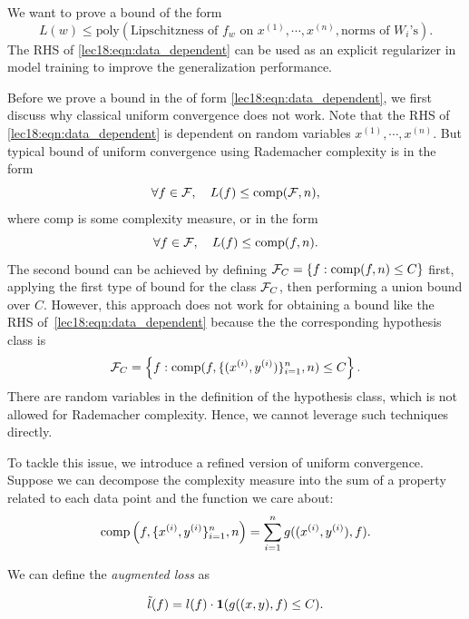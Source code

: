 We want to prove a bound of the form
\begin{equation}\label{lec18:eqn:data_dependent}
L(w)\leq \text{poly}(\text{Lipschitzness of $f_w$ on $x^{(1)}, \cdots, x^{(n)}$}, \text{norms of $W_i$'s}).
\end{equation}
The RHS of \eqref{lec18:eqn:data_dependent} can be used as an explicit regularizer in model training to improve the generalization performance. 

Before we prove a bound in the of form \eqref{lec18:eqn:data_dependent}, we first discuss why classical uniform convergence does not work. Note that the RHS of \eqref{lec18:eqn:data_dependent} is dependent on random variables $x^{(1)}, \cdots, x^{(n)}$. But typical bound of uniform convergence using Rademacher complexity is in the form
\begin{equation}
\forall f \in \mathcal F,\quad L(f) \leq \text{comp}(\mathcal F, n),
\end{equation}
where $\text{comp}$ is some complexity measure, or in the form
\begin{equation}
\forall f \in \mathcal F, \quad L(f) \leq \text{comp}(f, n).
\end{equation}
The second bound can be achieved by defining $\mathcal F_C= \{f: \text{comp}(f, n)\leq C\}$ first, applying the first type of bound for the class $\mathcal F_C$, then performing a union bound over $C$. However, this approach does not work for obtaining a bound like the RHS of~\eqref{lec18:eqn:data_dependent} because the the corresponding hypothesis class is
\begin{equation}
\mathcal F_C = \left\{f: \text{comp}(f, \{ (x^{(i)}, y^{(i)}) \}_{i=1}^n, n) \leq C \right\}.
\end{equation}
There are random variables in the definition of the hypothesis class, which is not allowed for Rademacher complexity. Hence, we cannot leverage such techniques directly.

To tackle this issue, we introduce a refined version of uniform convergence. Suppose we can decompose the complexity measure into the sum of a property related to each data point and the function we care about:
\begin{align}
\text{comp} \left(f, \{x^{(i)}, y^{(i)} \}_{i=1}^n, n \right) = \sum_{i=1}^n g((x^{(i)}, y^{(i)}), f).
\end{align}

We can define the \textit{augmented loss} as

\begin{align}
\Tilde{l} (f) = l(f) \cdot \bm{1} (g((x, y), f) \le C).
\end{align}

